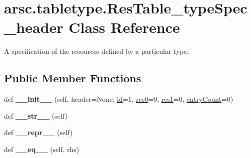 \hypertarget{classarsc_1_1tabletype_1_1ResTable__typeSpec__header}{}\section{arsc.\+tabletype.\+Res\+Table\+\_\+type\+Spec\+\_\+header Class Reference}
\label{classarsc_1_1tabletype_1_1ResTable__typeSpec__header}


A specification of the resources defined by a particular type.  


\subsection*{Public Member Functions}
\begin{DoxyCompactItemize}
\item 
\mbox{\label{classarsc_1_1tabletype_1_1ResTable__typeSpec__header_ac5c5d2aab3831b5d130e359add0ce909}} 
def {\bfseries \+\_\+\+\_\+init\+\_\+\+\_\+} (self, header=None, \mbox{\hyperlink{classarsc_1_1tabletype_1_1ResTable__typeSpec__header_a55532e4c76555a07dde16b0c1a6270ab}{id}}=1, \mbox{\hyperlink{classarsc_1_1tabletype_1_1ResTable__typeSpec__header_af16c543f562a5cc087c8b9e964767580}{res0}}=0, \mbox{\hyperlink{classarsc_1_1tabletype_1_1ResTable__typeSpec__header_a750db941c46e694f53b17c66e3e884b9}{res1}}=0, \mbox{\hyperlink{classarsc_1_1tabletype_1_1ResTable__typeSpec__header_a6747faeedd7cb05811bf2202c27e3152}{entry\+Count}}=0)
\item 
\mbox{\label{classarsc_1_1tabletype_1_1ResTable__typeSpec__header_ad2077f0761d1f5f27fdc3dee786be722}} 
def {\bfseries \+\_\+\+\_\+str\+\_\+\+\_\+} (self)
\item 
\mbox{\label{classarsc_1_1tabletype_1_1ResTable__typeSpec__header_a25e6fcbc3183dc6f66af36eeb6012d62}} 
def {\bfseries \+\_\+\+\_\+repr\+\_\+\+\_\+} (self)
\item 
\mbox{\label{classarsc_1_1tabletype_1_1ResTable__typeSpec__header_abedd23c653125e486c5a5b9912f9ee26}} 
def {\bfseries \+\_\+\+\_\+eq\+\_\+\+\_\+} (self, rhs)

\end{DoxyCompactItemize}
